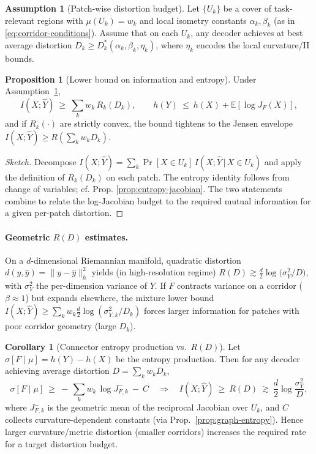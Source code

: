\documentclass{article}
\theoremstyle{definition}
\newtheorem{assumption}{Assumption}[section]
\newtheorem{corollary}[theorem]{Corollary}
\newtheorem{proposition}[theorem]{Proposition}
\begin{document}
\begin{assumption}[Patch-wise distortion budget]
\label{ass:patch-D}
Let $\{U_k\}$ be a cover of task-relevant regions with $\mu(U_k)=w_k$ and
local isometry constants $\alpha_k,\beta_k$ (as in \eqref{eq:corridor-conditions}).
Assume that on each $U_k$, any decoder achieves at best average distortion
$D_k\ge D^\ast_k(\alpha_k,\beta_k,\eta_k)$, where $\eta_k$ encodes the
local curvature/II bounds.
\end{assumption}

\begin{proposition}[Lower bound on information and entropy]
\label{prop:RD-lower}
Under Assumption~\ref{ass:patch-D},
\[
I(X;\widehat Y) \ \ge\ \sum_k w_k\, R_k(D_k),
\qquad
h(Y)\ \le\ h(X) + \mathbb{E}[\log J_F(X)],
\]
and if $R_k(\cdot)$ are strictly convex, the bound tightens to the Jensen
envelope $I(X;\widehat Y)\ge R(\sum_k w_k D_k)$.
\end{proposition}

\begin{proof}[Sketch]
Decompose $I(X;\widehat Y)=\sum_k \Pr[X\in U_k]\,
I(X;\widehat Y\,|\,X\in U_k)$ and apply the definition of $R_k(D_k)$ on each
patch. The entropy identity follows from change of variables; cf. Prop.
\ref{prop:entropy-jacobian}. The two statements combine to relate the
log-Jacobian budget to the required mutual information for a given per-patch
distortion.
\end{proof}

\paragraph{Geometric $R(D)$ estimates.}
On a $d$-dimensional Riemannian manifold,
quadratic distortion $d(y,\widehat y)=\|y-\widehat y\|_h^2$ yields
(in high-resolution regime) $R(D)\gtrsim \tfrac{d}{2}\log\!\big(\sigma_Y^2/D\big)$,
with $\sigma_Y^2$ the per-dimension variance of $Y$.
If $F$ contracts variance on a corridor ($\beta\approx 1$) but expands elsewhere,
the mixture lower bound
\(
I(X;\widehat Y)\ge \sum_k w_k \tfrac{d}{2}\log(\sigma_{Y,k}^2/D_k)
\)
forces larger information for patches with poor corridor geometry (large $D_k$).

\begin{corollary}[Connector entropy production vs.\ $R(D)$]
\label{cor:sigma-RD}
Let $\sigma[F\mid \mu]=h(Y)-h(X)$ be the entropy production.
Then for any decoder achieving average distortion $D=\sum_k w_k D_k$,
\[
\sigma[F\mid \mu]\ \ge\ -\,\sum_k w_k\, \log J_{F,k}^{-}\ -\ C
\quad\Longrightarrow\quad
I(X;\widehat Y)\ \ge\ R(D)\ \gtrsim\ \frac{d}{2}\log\!\frac{\sigma_Y^2}{D},
\]
where $J_{F,k}^{-}$ is the geometric mean of the reciprocal Jacobian over $U_k$,
and $C$ collects curvature-dependent constants (via Prop.~\ref{prop:graph-entropy}).
Hence larger curvature/metric distortion (smaller corridors) increases the
required rate for a target distortion budget.
\end{corollary}
\end{document}
